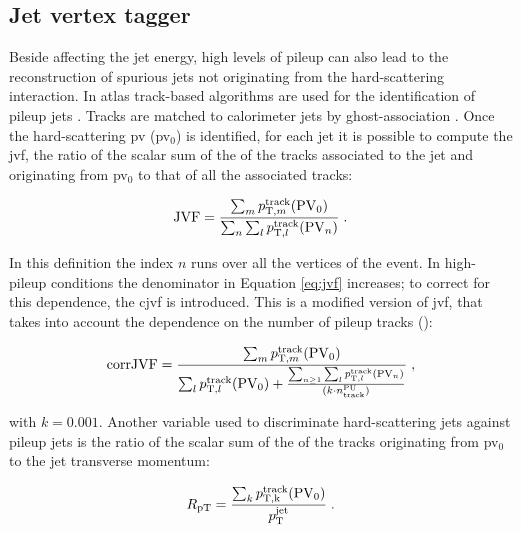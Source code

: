 \subsection{Jet vertex tagger}
\label{sec:jvt}

Beside affecting the jet energy, high levels of pileup can also lead to the reconstruction of spurious jets not originating from the hard-scattering interaction. In \gls{atlas} track-based algorithms are used for the identification of pileup jets \cite{Aad:2015ina,ATLAS-CONF-2014-018}. 
Tracks are matched to calorimeter jets by ghost-association \cite{Soyez:2012hv}. Once the hard-scattering \gls{pv} (\gls{pv}$_0$) is identified, 
for each jet it is possible to compute the \gls{jvf}, the ratio of the scalar sum of the \pt of the tracks associated to the jet and originating from  \gls{pv}$_0$ to that of all the associated tracks:

\begin{equation}
 {\rm JVF} = \frac{\sum_m{p_{{\rm T}, m}^{{\rm track}}({\rm PV}_0)}}{\sum_n\sum_l  p_{{\rm T}, l}^{{\rm track}}({\rm PV}_n)} \; .
 \label{eq:jvf}
\end{equation} 

\noindent In this definition the index $n$ runs over all the vertices of the event. In high-pileup conditions the denominator in 
Equation \ref{eq:jvf} increases; to correct for this dependence, the \gls{cjvf} is introduced. 
This is a modified version of \gls{jvf}, that takes into account the dependence on the number of pileup tracks (\nPUtrk):

\begin{equation}
{\rm corrJVF} = \frac{\sum_m{p_{{\rm T}, m}^{{\rm track}}({\rm PV}_0)}}{\sum_l p_{{\rm T}, l}^{{\rm track}}({\rm PV}_0) + \frac{\sum_{n\geq1}\sum_l p_{{\rm T}, l}^{{\rm track}}({\rm PV}_n)}{ (k \cdot n_\mathrm{track}^\mathrm{PU})}} \; , \nonumber
\end{equation}

\noindent with $k=0.001$. Another variable used to discriminate hard-scattering jets against pileup jets is the ratio of the scalar
sum of the \pt of the tracks originating from \gls{pv}$_0$ to the jet transverse momentum:


\begin{equation}
R_\mathrm{pT} = \frac{\sum_k{p_{\rm{T}, k}^{{\rm track}}({\rm PV}_0)}}{p_\mathrm{T}^\mathrm{jet}} \;.
\label{eq:obj:rpt}
\end{equation}

